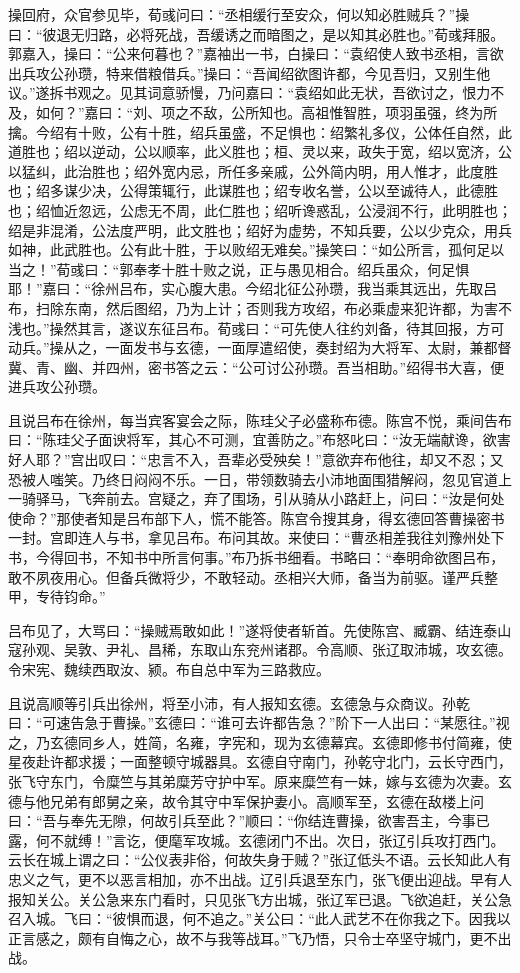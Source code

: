 操回府，众官参见毕，荀彧问曰：“丞相缓行至安众，何以知必胜贼兵？”操曰：“彼退无归路，必将死战，吾缓诱之而暗图之，是以知其必胜也。”荀彧拜服。郭嘉入，操曰：“公来何暮也？”嘉袖出一书，白操曰：“袁绍使人致书丞相，言欲出兵攻公孙瓒，特来借粮借兵。”操曰：“吾闻绍欲图许都，今见吾归，又别生他议。”遂拆书观之。见其词意骄慢，乃问嘉曰：“袁绍如此无状，吾欲讨之，恨力不及，如何？”嘉曰：“刘、项之不敌，公所知也。高祖惟智胜，项羽虽强，终为所擒。今绍有十败，公有十胜，绍兵虽盛，不足惧也：绍繁礼多仪，公体任自然，此道胜也；绍以逆动，公以顺率，此义胜也；桓、灵以来，政失于宽，绍以宽济，公以猛纠，此治胜也；绍外宽内忌，所任多亲戚，公外简内明，用人惟才，此度胜也；绍多谋少决，公得策辄行，此谋胜也；绍专收名誉，公以至诚待人，此德胜也；绍恤近忽远，公虑无不周，此仁胜也；绍听谗惑乱，公浸润不行，此明胜也；绍是非混淆，公法度严明，此文胜也；绍好为虚势，不知兵要，公以少克众，用兵如神，此武胜也。公有此十胜，于以败绍无难矣。”操笑曰：“如公所言，孤何足以当之！”荀彧曰：“郭奉孝十胜十败之说，正与愚见相合。绍兵虽众，何足惧耶！”嘉曰：“徐州吕布，实心腹大患。今绍北征公孙瓒，我当乘其远出，先取吕布，扫除东南，然后图绍，乃为上计；否则我方攻绍，布必乘虚来犯许都，为害不浅也。”操然其言，遂议东征吕布。荀彧曰：“可先使人往约刘备，待其回报，方可动兵。”操从之，一面发书与玄德，一面厚遣绍使，奏封绍为大将军、太尉，兼都督冀、青、幽、并四州，密书答之云：“公可讨公孙瓒。吾当相助。”绍得书大喜，便进兵攻公孙瓒。

且说吕布在徐州，每当宾客宴会之际，陈珪父子必盛称布德。陈宫不悦，乘间告布曰：“陈珪父子面谀将军，其心不可测，宜善防之。”布怒叱曰：“汝无端献谗，欲害好人耶？”宫出叹曰：“忠言不入，吾辈必受殃矣！”意欲弃布他往，却又不忍；又恐被人嗤笑。乃终日闷闷不乐。一日，带领数骑去小沛地面围猎解闷，忽见官道上一骑驿马，飞奔前去。宫疑之，弃了围场，引从骑从小路赶上，问曰：“汝是何处使命？”那使者知是吕布部下人，慌不能答。陈宫令搜其身，得玄德回答曹操密书一封。宫即连人与书，拿见吕布。布问其故。来使曰：“曹丞相差我往刘豫州处下书，今得回书，不知书中所言何事。”布乃拆书细看。书略曰：“奉明命欲图吕布，敢不夙夜用心。但备兵微将少，不敢轻动。丞相兴大师，备当为前驱。谨严兵整甲，专待钧命。”

吕布见了，大骂曰：“操贼焉敢如此！”遂将使者斩首。先使陈宫、臧霸、结连泰山寇孙观、吴敦、尹礼、昌稀，东取山东兖州诸郡。令高顺、张辽取沛城，攻玄德。令宋宪、魏续西取汝、颍。布自总中军为三路救应。

且说高顺等引兵出徐州，将至小沛，有人报知玄德。玄德急与众商议。孙乾曰：“可速告急于曹操。”玄德曰：“谁可去许都告急？”阶下一人出曰：“某愿往。”视之，乃玄德同乡人，姓简，名雍，字宪和，现为玄德幕宾。玄德即修书付简雍，使星夜赴许都求援；一面整顿守城器具。玄德自守南门，孙乾守北门，云长守西门，张飞守东门，令糜竺与其弟糜芳守护中军。原来糜竺有一妹，嫁与玄德为次妻。玄德与他兄弟有郎舅之亲，故令其守中军保护妻小。高顺军至，玄德在敌楼上问曰：“吾与奉先无隙，何故引兵至此？”顺曰：“你结连曹操，欲害吾主，今事已露，何不就缚！”言讫，便麾军攻城。玄德闭门不出。次日，张辽引兵攻打西门。云长在城上谓之曰：“公仪表非俗，何故失身于贼？”张辽低头不语。云长知此人有忠义之气，更不以恶言相加，亦不出战。辽引兵退至东门，张飞便出迎战。早有人报知关公。关公急来东门看时，只见张飞方出城，张辽军已退。飞欲追赶，关公急召入城。飞曰：“彼惧而退，何不追之。”关公曰：“此人武艺不在你我之下。因我以正言感之，颇有自悔之心，故不与我等战耳。”飞乃悟，只令士卒坚守城门，更不出战。

